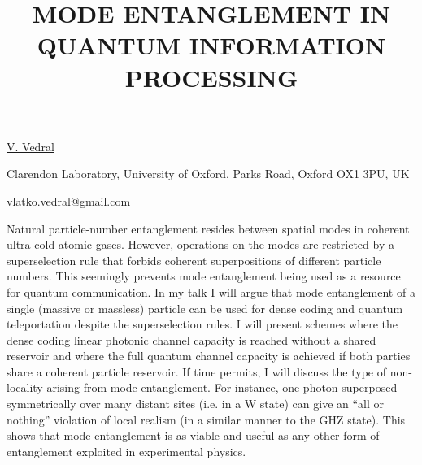 \title{MODE ENTANGLEMENT IN QUANTUM INFORMATION PROCESSING}

\underline{V. Vedral} 

{\normalsize{\vspace{-4mm}
Clarendon Laboratory, University of Oxford, Parks Road, Oxford OX1 3PU, UK

\email vlatko.vedral@gmail.com}}

Natural particle-number entanglement resides between spatial modes in coherent ultra-cold atomic
gases. However, operations on the modes are restricted by a superselection rule that forbids coherent superpositions of different particle numbers. This seemingly prevents mode entanglement being used as a resource for quantum communication. In my talk I will argue that mode entanglement
of a single (massive or massless) particle can be used for dense coding and quantum teleportation despite the superselection rules. I will present schemes where the dense coding linear photonic
channel capacity is reached without a shared reservoir and where the full quantum channel capacity
is achieved if both parties share a coherent particle reservoir. If time permits, I will discuss the type of non-locality arising from mode entanglement. For instance, one photon superposed symmetrically over many distant sites (i.e. in a W state) can give an ``all or nothing'' violation of local realism (in a similar manner to the GHZ state). This shows that mode entanglement is as viable and useful as any other form of entanglement exploited in experimental physics.

\vspace{\baselineskip} 